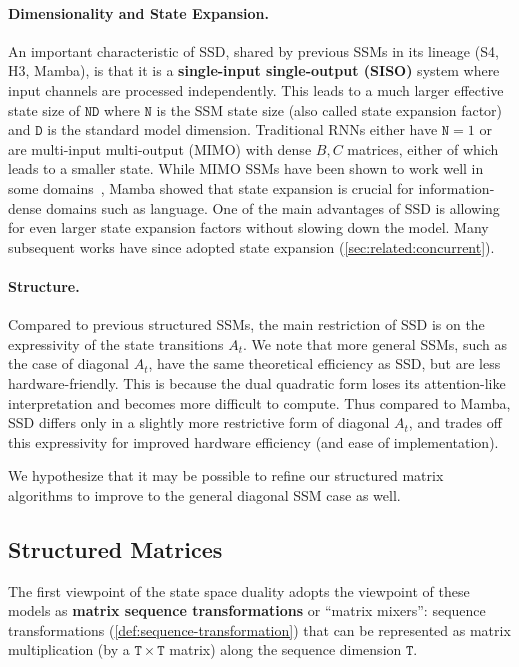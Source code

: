 \documentclass{article}
\newcommand{\citep}{\parencite}
\begin{document}
\paragraph{Dimensionality and State Expansion.}
An important characteristic of SSD, shared by previous SSMs in its lineage (S4, H3, Mamba), is that it is a \textbf{single-input single-output (SISO)} system where input channels are processed independently.
This leads to a much larger effective state size of $\mathtt{ND}$ where $\mathtt{N}$ is the SSM state size (also called state expansion factor) and $\mathtt{D}$ is the standard model dimension.
Traditional RNNs either have $\mathtt{N}=1$ or are
multi-input multi-output (MIMO) with dense $B, C$ matrices,
either of which leads to a smaller state.
While MIMO SSMs have been shown to work well in some domains~\citep{smith2023s5,orvieto2023resurrecting,lu2023structured}, Mamba showed that state expansion is crucial for information-dense domains such as language.
One of the main advantages of SSD is allowing for even larger state expansion factors without slowing down the model.
Many subsequent works have since adopted state expansion (\cref{sec:related:concurrent}).

\paragraph{Structure.}
Compared to previous structured SSMs,
the main restriction of SSD is on the expressivity of the state transitions $A_t$.
We note that more general SSMs, such as the case of diagonal $A_t$, have the same theoretical efficiency as SSD, but are less hardware-friendly.
This is because the dual quadratic form loses its attention-like interpretation and becomes more difficult to compute.
Thus compared to Mamba, SSD differs only in a slightly more restrictive form of diagonal $A_t$,
and trades off this expressivity for improved hardware efficiency (and ease of implementation).

We hypothesize that it may be possible to refine our structured matrix algorithms to improve to the general diagonal SSM case as well.

\subsection{Structured Matrices}
\label{sec:related:matrices}

The first viewpoint of the state space duality adopts the viewpoint of these models as \textbf{matrix sequence transformations} or ``matrix mixers'':
sequence transformations (\cref{def:sequence-transformation}) that can be represented as matrix multiplication (by a $\mathtt{T} \times \mathtt{T}$ matrix) along the sequence dimension $\mathtt{T}$.
\end{document}
